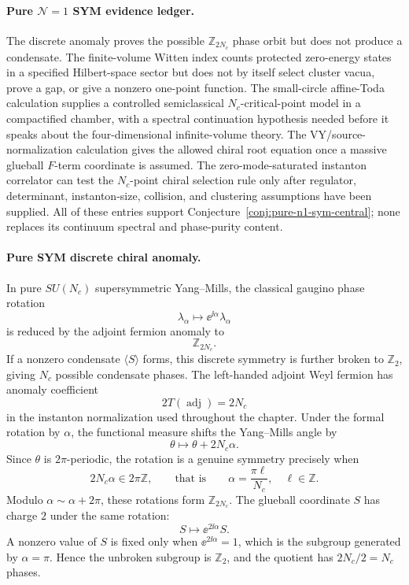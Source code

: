\paragraph{Pure \(\mathcal N=1\) SYM evidence ledger.}
The discrete anomaly proves the possible \(\mathbb Z_{2N_c}\) phase orbit but
does not produce a condensate.  The finite-volume Witten index counts protected
zero-energy states in a specified Hilbert-space sector but does not by itself
select cluster vacua, prove a gap, or give a nonzero one-point function.  The
small-circle affine-Toda calculation supplies a controlled semiclassical
\(N_c\)-critical-point model in a compactified chamber, with a spectral
continuation hypothesis needed before it speaks about the four-dimensional
infinite-volume theory.  The VY/source-normalization calculation gives the
allowed chiral root equation once a massive glueball \(F\)-term coordinate is
assumed.  The zero-mode-saturated instanton correlator can test the
\(N_c\)-point chiral selection rule only after regulator, determinant,
instanton-size, collision, and clustering assumptions have been supplied.  All
of these entries support Conjecture~\ref{conj:pure-n1-sym-central}; none
replaces its continuum spectral and phase-purity content.

\paragraph{Pure SYM discrete chiral anomaly.}
In pure \(SU(N_c)\) supersymmetric Yang--Mills, the classical gaugino phase
rotation
\[
  \lambda_\alpha\longmapsto \ee^{\ii\alpha}\lambda_\alpha
\]
is reduced by the adjoint fermion anomaly to
\[
  \mathbb Z_{2N_c}.
\]
If a nonzero condensate \(\langle S\rangle\) forms, this discrete symmetry is
further broken to \(\mathbb Z_2\), giving \(N_c\) possible condensate
phases.
The left-handed adjoint Weyl fermion has anomaly coefficient
\[
  2T(\operatorname{adj})=2N_c
\]
in the instanton normalization used throughout the chapter.  Under the
formal rotation by \(\alpha\), the functional measure shifts the Yang--Mills
angle by
\[
  \theta\longmapsto \theta+2N_c\alpha .
\]
Since \(\theta\) is \(2\pi\)-periodic, the rotation is a genuine symmetry
precisely when
\[
  2N_c\alpha\in2\pi\mathbb Z,
  \qquad\text{that is}\qquad
  \alpha=\frac{\pi\ell}{N_c},\quad \ell\in\mathbb Z .
\]
Modulo \(\alpha\sim\alpha+2\pi\), these rotations form
\(\mathbb Z_{2N_c}\).  The glueball coordinate \(S\) has charge \(2\) under
the same rotation:
\[
  S\longmapsto \ee^{2\ii\alpha}S .
\]
A nonzero value of \(S\) is fixed only when \(\ee^{2\ii\alpha}=1\), which is
the subgroup generated by \(\alpha=\pi\).  Hence the unbroken subgroup is
\(\mathbb Z_2\), and the quotient has \(2N_c/2=N_c\) phases.

